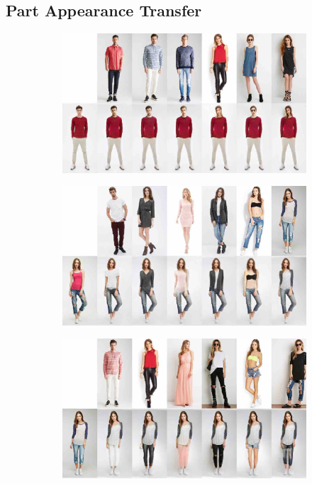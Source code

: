 	\subsection{Part Appearance Transfer}\label{sec:partappearance}
	\begin{figure}[htp]
		\begin{subfigure}{0.49\linewidth}
		\centering
		\includegraphics[trim={0cm 0cm 0cm 0cm},clip, width=1.\linewidth]{fig/factor/part6_01}\caption{}
		\label{fig:part3_00}
		\end{subfigure}
		\begin{subfigure}{0.49\linewidth}
		\centering
		\includegraphics[trim={0cm 0cm 0cm 0cm},clip, width=1.\linewidth]{fig/factor/part6_10}\caption{}
		\label{fig:part3_11}
		\end{subfigure}
		\begin{subfigure}{0.49\linewidth}
		\centering
		\includegraphics[trim={0cm 0cm 0cm 0cm},clip, width=1.\linewidth]{fig/factor/part6_21}\caption{}

\end{subfigure}
\end{figure}
